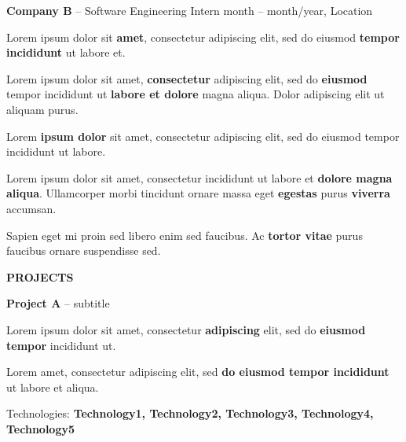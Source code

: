 \documentclass[11pt]{resume} %
\begin{document}
\medskip

{\bf {\Large{Company B}}} -- Software Engineering Intern \hfill month -- month/year, Location \\[-25]
\begin{list}{\textbullet}{\leftmargin=0.6em \itemindent=0.45em}
    \item Lorem ipsum dolor sit \textbf{amet}, consectetur adipiscing elit, sed do eiusmod \textbf{tempor incididunt} ut labore et.
    
    \item Lorem ipsum dolor sit amet, \textbf{consectetur} adipiscing elit, sed do \textbf{eiusmod} tempor incididunt ut \textbf{labore et dolore} magna aliqua. Dolor adipiscing elit ut aliquam purus.
    
    \item Lorem \textbf{ipsum dolor} sit amet, consectetur adipiscing elit, sed do eiusmod tempor incididunt ut labore.
    
    \item Lorem ipsum dolor sit amet, consectetur incididunt ut labore et \textbf{dolore magna aliqua}. Ullamcorper morbi tincidunt ornare massa eget \textbf{egestas} purus \textbf{viverra} accumsan.
    
    \item Sapien eget mi proin sed libero enim sed faucibus. Ac \textbf{tortor vitae} purus faucibus ornare suspendisse sed.\\[-25]
\end{list}

\bigskip
\begin{flushleft}
    {\Large \textbf{{PROJECTS}}}
\end{flushleft}
\smallskip
\hline
{\bf Project A} -- subtitle\\[-25]
\begin{list}{\textbullet}{\leftmargin=0.6em \itemindent=0.45em}
    \item Lorem ipsum dolor sit amet, consectetur \textbf{adipiscing} elit, sed do \textbf{eiusmod} \textbf{tempor} incididunt ut.

    \item Lorem amet, consectetur adipiscing elit, sed \textbf{do eiusmod tempor incididunt} ut labore et aliqua.
    
    \item Technologies: \textbf{Technology1, Technology2, Technology3, Technology4, Technology5}
\end{list}
\end{document}
